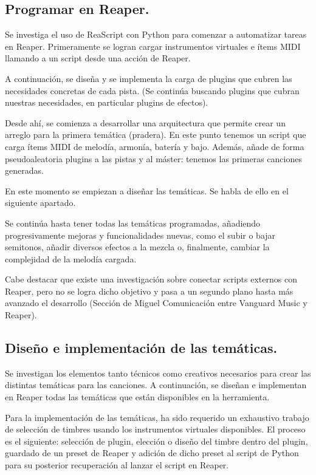 \subsection*{Programar en Reaper.}
Se investiga el uso de ReaScript con Python para comenzar a automatizar tareas en Reaper. Primeramente se logran cargar instrumentos virtuales e ítems MIDI llamando a un script desde una acción de Reaper.

A continuación, se diseña y se implementa la carga de plugins que cubren las necesidades concretas de cada pista. (Se continúa buscando plugins que cubran nuestras necesidades, en particular plugins de efectos).

Desde ahí, se comienza a desarrollar una arquitectura que permite crear un arreglo para la primera temática (pradera). En este punto tenemos un script que carga ítems MIDI de melodía, armonía, batería y bajo. Además, añade de forma pseudoaleatoria plugins a las pistas y al máster: tenemos las primeras canciones generadas.

En este momento se empiezan a diseñar las temáticas. Se habla de ello en el siguiente apartado.

Se continúa hasta tener todas las temáticas programadas, añadiendo progresivamente mejoras y funcionalidades nuevas, como el subir o bajar semitonos, añadir diversos efectos a la mezcla o, finalmente, cambiar la complejidad de la melodía cargada.

Cabe destacar que existe una investigación sobre conectar scripts externos con Reaper, pero no se logra dicho objetivo y pasa a un segundo plano hasta más avanzado el desarrollo (Sección de Miguel Comunicación entre Vanguard Music y Reaper).

\subsection*{Diseño e implementación de las temáticas.}
Se investigan los elementos tanto técnicos como creativos necesarios para crear las distintas temáticas para las canciones. A continuación, se diseñan e implementan en Reaper todas las temáticas que están disponibles en la herramienta.

Para la implementación de las temáticas, ha sido requerido un exhaustivo trabajo de selección de timbres usando los instrumentos virtuales disponibles. El proceso es el siguiente: selección de plugin, elección o diseño del timbre dentro del plugin, guardado de un preset de Reaper y adición de dicho preset al script de Python para su posterior recuperación al lanzar el script en Reaper.

